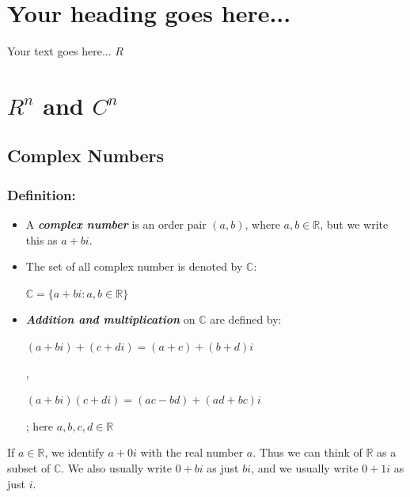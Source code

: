 \documentclass{report}
\begin{document}
\section{Your heading goes here...}

Your text goes here...
$R$

\section{$R^n$ and $C^n$}
\subsection{Complex Numbers}
\subsubsection{Definition:}
\begin{itemize}
    \item A \textbf{\textit{complex number}} is an order pair $(a,b)$, where $a, b \in \mathbb{R}$, but we write this as $a+bi$.
    \item The set of all complex number is denoted by $\mathbb{C}$:\newline\medskip
        \centerline{$\mathbb{C}=\{a+bi:a,b \in \mathbb{R}\}$}
   \item \textbf{\textit{Addition and multiplication}} on $\mathbb{C}$ are defined by:\newline
   \centerline{$(a+bi)+(c+di)=(a+c)+(b+d)i$},\newline\medskip
   \centerline{$(a+bi)(c+di)=(ac-bd)+(ad+bc)i$};\newline\medskip
   here $a,b,c,d \in \mathbb{R}$
\end{itemize}

If $a \in \mathbb{R}$, we identify $a+0i$ with the real number $a$. Thus we can think of $\mathbb{R}$ as a subset of $\mathbb{C}$. We also usually write $0+bi$ as just $bi$, and we usually write $0+1i$ as just $i$.
\end{document}
